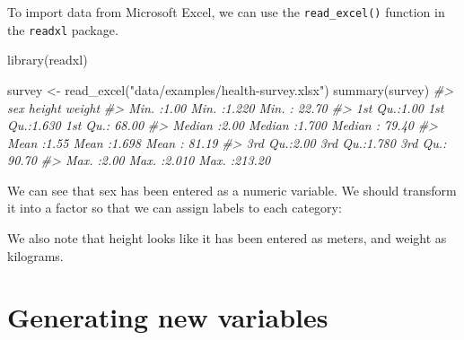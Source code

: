 \documentclass[
]{memoir}
\newenvironment{Shaded}{\begin{snugshade}}{\end{snugshade}}
\newcommand{\AttributeTok}[1]{\textcolor[rgb]{0.77,0.63,0.00}{#1}}
\newcommand{\CommentTok}[1]{\textcolor[rgb]{0.56,0.35,0.01}{\textit{#1}}}
\newcommand{\DecValTok}[1]{\textcolor[rgb]{0.00,0.00,0.81}{#1}}
\newcommand{\FunctionTok}[1]{\textcolor[rgb]{0.00,0.00,0.00}{#1}}
\newcommand{\NormalTok}[1]{#1}
\newcommand{\OtherTok}[1]{\textcolor[rgb]{0.56,0.35,0.01}{#1}}
\newcommand{\SpecialCharTok}[1]{\textcolor[rgb]{0.00,0.00,0.00}{#1}}
\newcommand{\StringTok}[1]{\textcolor[rgb]{0.31,0.60,0.02}{#1}}
\begin{document}
To import data from Microsoft Excel, we can use the \texttt{read\_excel()} function in the \texttt{readxl} package.

\begin{Shaded}
\begin{Highlighting}[]
\FunctionTok{library}\NormalTok{(readxl)}

\NormalTok{survey }\OtherTok{\textless{}{-}} \FunctionTok{read\_excel}\NormalTok{(}\StringTok{"data/examples/health{-}survey.xlsx"}\NormalTok{)}
\FunctionTok{summary}\NormalTok{(survey)}
\CommentTok{\#\textgreater{}       sex           height          weight      }
\CommentTok{\#\textgreater{}  Min.   :1.00   Min.   :1.220   Min.   : 22.70  }
\CommentTok{\#\textgreater{}  1st Qu.:1.00   1st Qu.:1.630   1st Qu.: 68.00  }
\CommentTok{\#\textgreater{}  Median :2.00   Median :1.700   Median : 79.40  }
\CommentTok{\#\textgreater{}  Mean   :1.55   Mean   :1.698   Mean   : 81.19  }
\CommentTok{\#\textgreater{}  3rd Qu.:2.00   3rd Qu.:1.780   3rd Qu.: 90.70  }
\CommentTok{\#\textgreater{}  Max.   :2.00   Max.   :2.010   Max.   :213.20}
\end{Highlighting}
\end{Shaded}

We can see that sex has been entered as a numeric variable. We should transform it into a factor so that we can assign labels to each category:

\begin{Shaded}
\end{Shaded}

We also note that height looks like it has been entered as meters, and weight as kilograms.

\hypertarget{generating-new-variables}{%
\section{Generating new variables}\label{generating-new-variables}}
\end{document}
